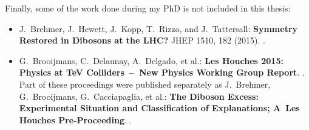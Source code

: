 Finally, some of the work done during my PhD is not included in this thesis:
%
\begin{itemize}
  \item[\cite{Brehmer:2015cia}] J.~Brehmer, J.~Hewett, J.~Kopp, T.~Rizzo, and J.~Tattersall:\newline
	\textbf{Symmetry Restored in Dibosons at the LHC?} \newline
	JHEP 1510, 182 (2015). .
  \item[\cite{Brehmer:2015dan,Brooijmans:2016vro}] G.~Brooijmans, C.~Delaunay, A.~Delgado, et al.:\newline
         \textbf{Les Houches 2015: Physics at TeV Colliders~--~New Physics Working Group Report}.\newline
        .\newline
         Part of these proceedings were published separately as\newline
         J.~Brehmer, G.~Brooijmans,  G.~Cacciapaglia, et al.:\newline
	\textbf{The Diboson Excess: Experimental Situation and Classification of Explanations; A~Les Houches Pre-Proceeding}.\newline
	.
\end{itemize}
